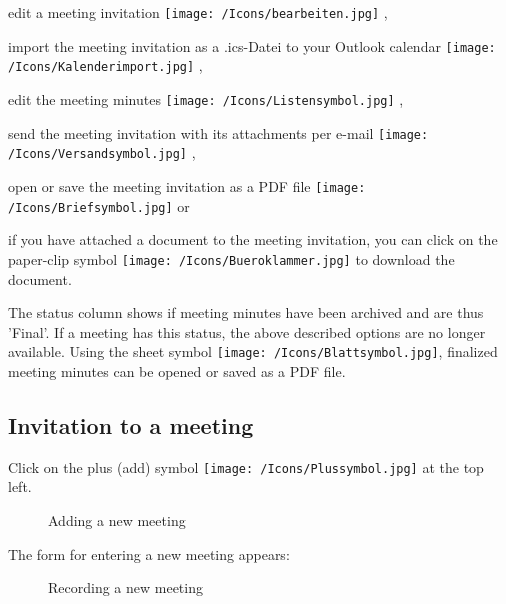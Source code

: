 \begin{compactitem}
\item edit a meeting invitation \texttt{[image: /Icons/bearbeiten.jpg]} ,
\item import the meeting invitation as a .ics-Datei to your Outlook calendar \texttt{[image: /Icons/Kalenderimport.jpg]} ,
\item edit the meeting minutes \texttt{[image: /Icons/Listensymbol.jpg]} ,
\item send the meeting invitation with its attachments per e-mail \texttt{[image: /Icons/Versandsymbol.jpg]} ,
\item open or save the meeting invitation as a PDF file \texttt{[image: /Icons/Briefsymbol.jpg]}  or 
\item if you have attached a document to the meeting invitation, you can click on the paper-clip symbol \texttt{[image: /Icons/Bueroklammer.jpg]}  to download the document.
\end{compactitem}

\vspace{\baselineskip}

The status column  shows if meeting minutes have been archived and are thus 'Final'. If a meeting has this status, the above described options are no longer available. Using the sheet symbol \texttt{[image: /Icons/Blattsymbol.jpg]}, finalized meeting minutes can be opened or saved as a PDF file.

\subsection{Invitation to a meeting}
\label{bkm:Ref434828480}

Click on the plus (add) symbol \texttt{[image: /Icons/Plussymbol.jpg]}  at the top left.

\vspace{\baselineskip}

\begin{figure}[H]
\caption{Adding a new meeting}
\end{figure}


The form for entering a new meeting appears:

\begin{figure}[H]
\caption{Recording a new meeting}
\end{figure}

